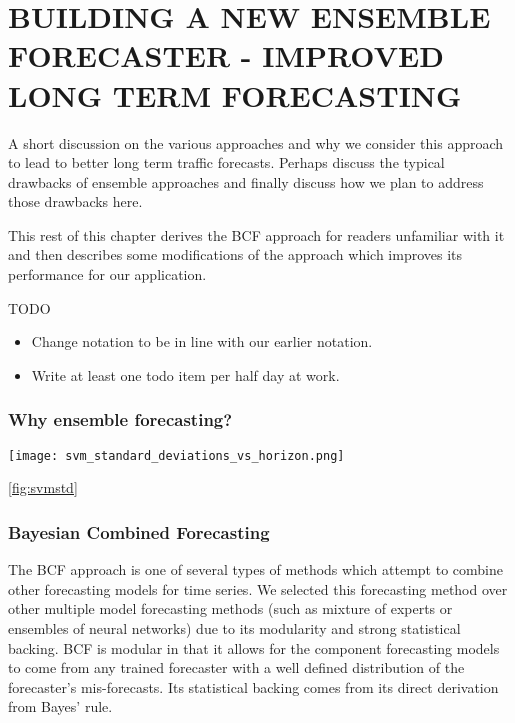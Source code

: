 \chapter{BUILDING A NEW ENSEMBLE FORECASTER - IMPROVED LONG TERM FORECASTING}
\label{ch:BCF}
A short discussion on the various approaches and why we consider this approach to lead to better long term traffic forecasts.  Perhaps discuss the typical drawbacks of ensemble approaches and finally discuss how we plan to address those drawbacks here.

This rest of this chapter derives the BCF approach for readers unfamiliar with it and then describes some modifications of the approach which improves its performance for our application.

TODO
\begin{itemize}
	\item Change notation to be in line with our earlier notation.
	\item Write at least one todo item per half day at work.

\end{itemize}

\subsection{Why ensemble forecasting?}
\begin{figure*}[t]
\centering
\texttt{[image: svm\_standard\_deviations\_vs\_horizon.png]}
\caption{Standard deviation of support vector machine residuals for all Wednesdays in MERL dataset.  Time index represents 10 minute intervals from 6:00am to 7:00pm.}
\label{fig:svmstd}
\end{figure*}

\ref{fig:svmstd}


\subsection{Bayesian Combined Forecasting}
The BCF approach \cite{Petridis2001} is one of several types of methods which attempt to combine other forecasting models for time series. We selected this forecasting method over other multiple model forecasting methods (such as mixture of experts or ensembles of neural networks) due to its modularity and strong statistical backing.  BCF is modular in that it allows for the component forecasting models to come from any trained forecaster with a well defined distribution of the forecaster's mis-forecasts.  Its statistical backing comes from its direct derivation from Bayes' rule.

